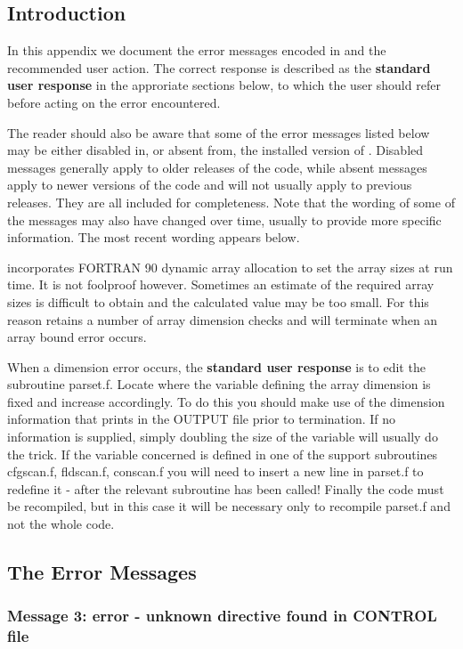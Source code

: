 

\label{A2} 
\subsection*{Introduction}
In this appendix we document the error messages encoded in \D{} and the recommended user action. 
The correct response is described as the {\bf standard user
response} in the approriate sections below, to which the user should
refer before acting on the error encountered.

The reader should also be aware that some of the error messages listed
below may be either disabled in, or absent from, the installed version
of \D{}. Disabled messages generally apply to older releases of the
code, while absent messages apply to newer versions of the code and
will not usually apply to previous releases.  They are all included
for completeness. Note that the wording of some of the messages may
also have changed over time, usually to provide more specific
information. The most recent wording appears below.

\D{} incorporates FORTRAN 90 dynamic array allocation to set
the array sizes at run time. It is not foolproof however. Sometimes an
estimate of the required array sizes is difficult to obtain and the
calculated value may be too small. For this reason \D{} retains a number
of array dimension checks and will terminate when an array bound error
occurs.

When a dimension error occurs, the {\bf standard user response} is to
edit the \D{} subroutine {\sc parset.f}. Locate where the variable
defining the array dimension is fixed and increase accordingly. To do
this you should make use of the dimension information that \D{} prints in
the OUTPUT file prior to termination. If no information is supplied,
simply doubling the size of the variable will usually do the trick.
If the variable concerned is defined in one of the support subroutines
{\sc cfgscan.f, fldscan.f, conscan.f} you will need to insert a new
line in {\sc parset.f} to redefine it - after the relevant subroutine
has been called! Finally the code must be recompiled, but in this case
it will be necessary only to recompile {\sc parset.f} and not the
whole code.

\subsection*{The \D{} Error Messages}

\subsubsection*{Message 3: error - unknown directive found in CONTROL
file}

